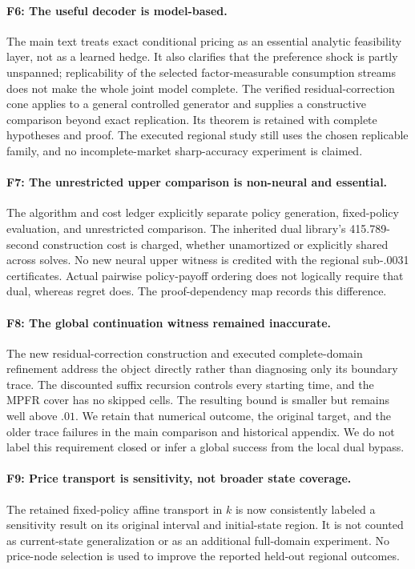 \paragraph{F6: The useful decoder is model-based.}
The main text treats exact conditional pricing as an essential analytic feasibility layer, not as a learned hedge. It also clarifies that the preference shock is partly unspanned; replicability of the selected factor-measurable consumption streams does not make the whole joint model complete. The verified residual-correction cone applies to a general controlled generator and supplies a constructive comparison beyond exact replication. Its theorem is retained with complete hypotheses and proof. The executed regional study still uses the chosen replicable family, and no incomplete-market sharp-accuracy experiment is claimed.

\paragraph{F7: The unrestricted upper comparison is non-neural and essential.}
The algorithm and cost ledger explicitly separate policy generation, fixed-policy evaluation, and unrestricted comparison. The inherited dual library's 415.789-second construction cost is charged, whether unamortized or explicitly shared across solves. No new neural upper witness is credited with the regional sub-.0031 certificates. Actual pairwise policy-payoff ordering does not logically require that dual, whereas regret does. The proof-dependency map records this difference.

\paragraph{F8: The global continuation witness remained inaccurate.}
The new residual-correction construction and executed complete-domain refinement address the object directly rather than diagnosing only its boundary trace. The discounted suffix recursion controls every starting time, and the MPFR cover has no skipped cells. The resulting bound is smaller but remains well above $.01$. We retain that numerical outcome, the original target, and the older trace failures in the main comparison and historical appendix. We do not label this requirement closed or infer a global success from the local dual bypass.

\paragraph{F9: Price transport is sensitivity, not broader state coverage.}
The retained fixed-policy affine transport in $k$ is now consistently labeled a sensitivity result on its original interval and initial-state region. It is not counted as current-state generalization or as an additional full-domain experiment. No price-node selection is used to improve the reported held-out regional outcomes.

